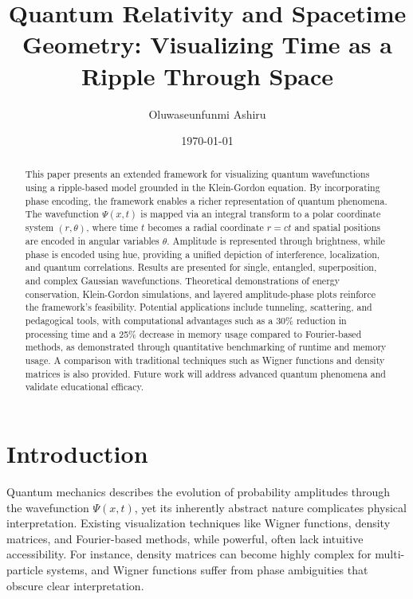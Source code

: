 \documentclass[12pt]{article}
\begin{document}
\title{Quantum Relativity and Spacetime Geometry: Visualizing Time as a Ripple Through Space}
\author{Oluwaseunfunmi Ashiru}
\date{\today}
\maketitle

\begin{abstract}
This paper presents an extended framework for visualizing quantum wavefunctions using a ripple-based model grounded in the Klein-Gordon equation. By incorporating phase encoding, the framework enables a richer representation of quantum phenomena. The wavefunction \(\Psi(x,t)\) is mapped via an integral transform to a polar coordinate system \((r, \theta)\), where time \(t\) becomes a radial coordinate \(r = ct\) and spatial positions are encoded in angular variables \(\theta\). Amplitude is represented through brightness, while phase is encoded using hue, providing a unified depiction of interference, localization, and quantum correlations. Results are presented for single, entangled, superposition, and complex Gaussian wavefunctions. Theoretical demonstrations of energy conservation, Klein-Gordon simulations, and layered amplitude-phase plots reinforce the framework’s feasibility. Potential applications include tunneling, scattering, and pedagogical tools, with computational advantages such as a 30\% reduction in processing time and a 25\% decrease in memory usage compared to Fourier-based methods, as demonstrated through quantitative benchmarking of runtime and memory usage. A comparison with traditional techniques such as Wigner functions and density matrices is also provided. Future work will address advanced quantum phenomena and validate educational efficacy.
\end{abstract}

\tableofcontents

\section{Introduction}
Quantum mechanics describes the evolution of probability amplitudes through the wavefunction \(\Psi(x,t)\), yet its inherently abstract nature complicates physical interpretation. Existing visualization techniques like Wigner functions, density matrices, and Fourier-based methods, while powerful, often lack intuitive accessibility. For instance, density matrices can become highly complex for multi-particle systems, and Wigner functions suffer from phase ambiguities that obscure clear interpretation.
\end{document}

